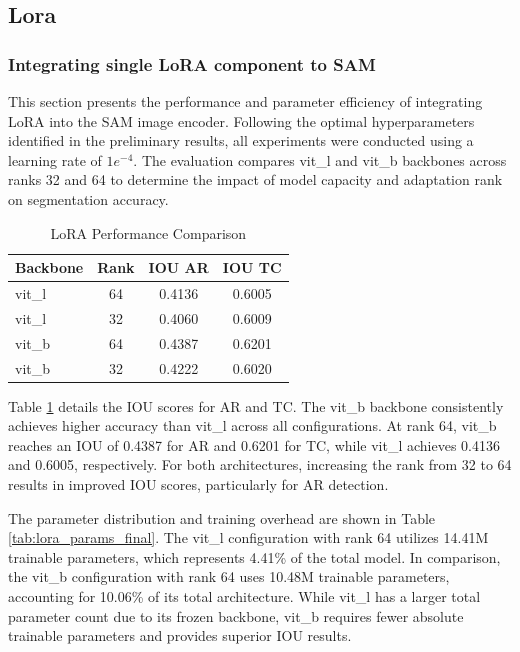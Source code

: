 \subsection{Lora}
\subsubsection{Integrating single LoRA component to SAM}
This section presents the performance and parameter efficiency of integrating LoRA into the SAM image encoder. Following the optimal hyperparameters identified in the preliminary results, all experiments were conducted using a learning rate of $1e^{-4}$. The evaluation compares vit\_l and vit\_b backbones across ranks 32 and 64 to determine the impact of model capacity and adaptation rank on segmentation accuracy.

\begin{table}[h]
\centering
\begin{tabular}{lccc}
\hline
Backbone & Rank & IOU AR & IOU TC \\
\hline
vit\_l & 64 & 0.4136 & 0.6005 \\
vit\_l & 32 & 0.4060 & 0.6009 \\
vit\_b & 64 & 0.4387 & 0.6201 \\
vit\_b & 32 & 0.4222 & 0.6020 \\
\hline
\end{tabular}
\caption{LoRA Performance Comparison}
\label{tab:lora_performance}
\end{table}



Table \ref{tab:lora_performance} details the IOU scores for AR and TC. The vit\_b backbone consistently achieves higher accuracy than vit\_l across all configurations. At rank 64, vit\_b reaches an IOU of 0.4387 for AR and 0.6201 for TC, while vit\_l achieves 0.4136 and 0.6005, respectively. For both architectures, increasing the rank from 32 to 64 results in improved IOU scores, particularly for AR detection.

The parameter distribution and training overhead are shown in Table \ref{tab:lora_params_final}. The vit\_l configuration with rank 64 utilizes 14.41M trainable parameters, which represents 4.41\% of the total model. In comparison, the vit\_b configuration with rank 64 uses 10.48M trainable parameters, accounting for 10.06\% of its total architecture. While vit\_l has a larger total parameter count due to its frozen backbone, vit\_b requires fewer absolute trainable parameters and provides superior IOU results.


